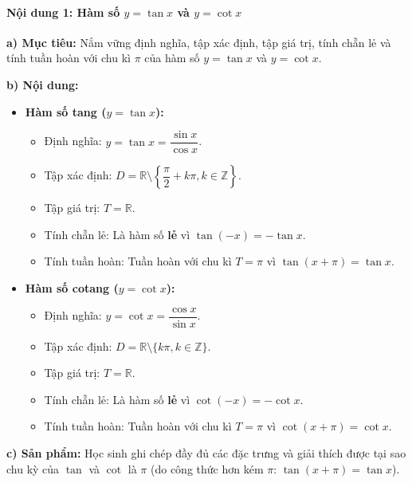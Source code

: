 \documentclass[12pt, a4paper]{article}
\begin{document}
\paragraph{Nội dung 1: Hàm số $y = \tan x$ và $y = \cot x$}
\textbf{a) Mục tiêu:} Nắm vững định nghĩa, tập xác định, tập giá trị, tính chẵn lẻ và tính tuần hoàn với chu kì $\pi$ của hàm số $y = \tan x$ và $y = \cot x$.

\textbf{b) Nội dung:}
\begin{itemize}[leftmargin=0.6cm]
    \item \textbf{Hàm số tang ($y = \tan x$):}
    \begin{itemize}[leftmargin=0.5cm]
        \item Định nghĩa: $y = \tan x = \dfrac{\sin x}{\cos x}$.
        \item Tập xác định: $D = \mathbb{R} \setminus \left\{\dfrac{\pi}{2} + k\pi, k \in \mathbb{Z}\right\}$.
        \item Tập giá trị: $T = \mathbb{R}$.
        \item Tính chẵn lẻ: Là hàm số \textbf{lẻ} vì $\tan(-x) = -\tan x$.
        \item Tính tuần hoàn: Tuần hoàn với chu kì \textbf{$T = \pi$} vì $\tan(x + \pi) = \tan x$.
    \end{itemize}
    \item \textbf{Hàm số cotang ($y = \cot x$):}
    \begin{itemize}[leftmargin=0.5cm]
        \item Định nghĩa: $y = \cot x = \dfrac{\cos x}{\sin x}$.
        \item Tập xác định: $D = \mathbb{R} \setminus \{k\pi, k \in \mathbb{Z}\}$.
        \item Tập giá trị: $T = \mathbb{R}$.
        \item Tính chẵn lẻ: Là hàm số \textbf{lẻ} vì $\cot(-x) = -\cot x$.
        \item Tính tuần hoàn: Tuần hoàn với chu kì \textbf{$T = \pi$} vì $\cot(x + \pi) = \cot x$.
    \end{itemize}
\end{itemize}

\textbf{c) Sản phẩm:} Học sinh ghi chép đầy đủ các đặc trưng và giải thích được tại sao chu kỳ của $\tan$ và $\cot$ là $\pi$ (do công thức hơn kém $\pi$: $\tan(x + \pi) = \tan x$).
\end{document}
